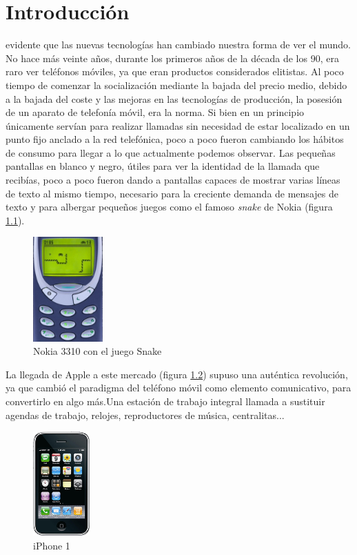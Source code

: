 \chapter{Introducción}


 evidente que las nuevas tecnologías han cambiado nuestra forma de ver el mundo. No hace más veinte años, durante los primeros años de la década de los 90, era raro ver teléfonos móviles, ya que eran productos considerados elitistas. Al poco tiempo de comenzar la socialización mediante la bajada del precio medio, debido a la bajada del coste y las mejoras en las tecnologías de producción, la posesión de un aparato de telefonía móvil, era la norma. Si bien en un principio únicamente servían para realizar llamadas sin necesidad de estar localizado en un punto fijo anclado a la red telefónica, poco a poco fueron cambiando los hábitos de consumo para llegar a lo que actualmente podemos observar. Las pequeñas pantallas en blanco y negro, útiles para ver la identidad de la llamada que recibías, poco a poco fueron dando a pantallas capaces de mostrar varias líneas de texto al mismo tiempo, necesario para la creciente demanda de mensajes de texto y para albergar pequeños juegos como el famoso \textit{snake} de Nokia (figura \ref{fig:Nokia_snake}). 

\begin{figure}[hbtp]
\centering
\includegraphics[height=40mm, fbox={\fboxrule} 4mm]{images/introduccion/Nokia_snake.jpg}
\caption{Nokia 3310 con el juego Snake}
\label{fig:Nokia_snake}
\end{figure}

La llegada de Apple a este mercado (figura \ref{fig:Iphone}) supuso una auténtica revolución, ya que cambió el paradigma del teléfono móvil como elemento comunicativo, para convertirlo en algo más.Una estación de trabajo integral llamada a sustituir agendas de trabajo, relojes, reproductores de música, centralitas...\\

\begin{figure}[hbtp]
\centering
\includegraphics[height=40mm, fbox={\fboxrule} 4mm]{images/introduccion/Iphone1.jpg}
\caption{iPhone 1}
\label{fig:Iphone}
\end{figure}


